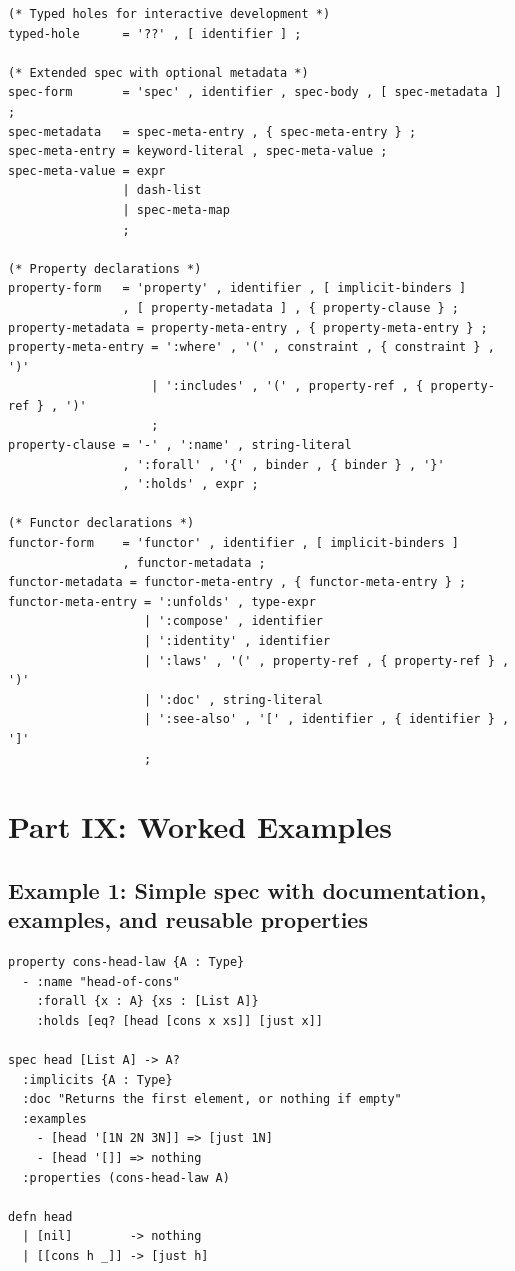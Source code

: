 \documentclass[11pt]{article}
\begin{document}
\begin{verbatim}
(* Typed holes for interactive development *)
typed-hole      = '??' , [ identifier ] ;

(* Extended spec with optional metadata *)
spec-form       = 'spec' , identifier , spec-body , [ spec-metadata ] ;
spec-metadata   = spec-meta-entry , { spec-meta-entry } ;
spec-meta-entry = keyword-literal , spec-meta-value ;
spec-meta-value = expr
                | dash-list
                | spec-meta-map
                ;

(* Property declarations *)
property-form   = 'property' , identifier , [ implicit-binders ]
                , [ property-metadata ] , { property-clause } ;
property-metadata = property-meta-entry , { property-meta-entry } ;
property-meta-entry = ':where' , '(' , constraint , { constraint } , ')'
                    | ':includes' , '(' , property-ref , { property-ref } , ')'
                    ;
property-clause = '-' , ':name' , string-literal
                , ':forall' , '{' , binder , { binder } , '}'
                , ':holds' , expr ;

(* Functor declarations *)
functor-form    = 'functor' , identifier , [ implicit-binders ]
                , functor-metadata ;
functor-metadata = functor-meta-entry , { functor-meta-entry } ;
functor-meta-entry = ':unfolds' , type-expr
                   | ':compose' , identifier
                   | ':identity' , identifier
                   | ':laws' , '(' , property-ref , { property-ref } , ')'
                   | ':doc' , string-literal
                   | ':see-also' , '[' , identifier , { identifier } , ']'
                   ;
\end{verbatim}
\section{Part IX: Worked Examples}
\label{sec:orge0fe50e}

\subsection{Example 1: Simple spec with documentation, examples, and reusable properties}
\label{sec:org6554574}

\begin{verbatim}
property cons-head-law {A : Type}
  - :name "head-of-cons"
    :forall {x : A} {xs : [List A]}
    :holds [eq? [head [cons x xs]] [just x]]

spec head [List A] -> A?
  :implicits {A : Type}
  :doc "Returns the first element, or nothing if empty"
  :examples
    - [head '[1N 2N 3N]] => [just 1N]
    - [head '[]] => nothing
  :properties (cons-head-law A)

defn head
  | [nil]        -> nothing
  | [[cons h _]] -> [just h]
\end{verbatim}
\end{document}
